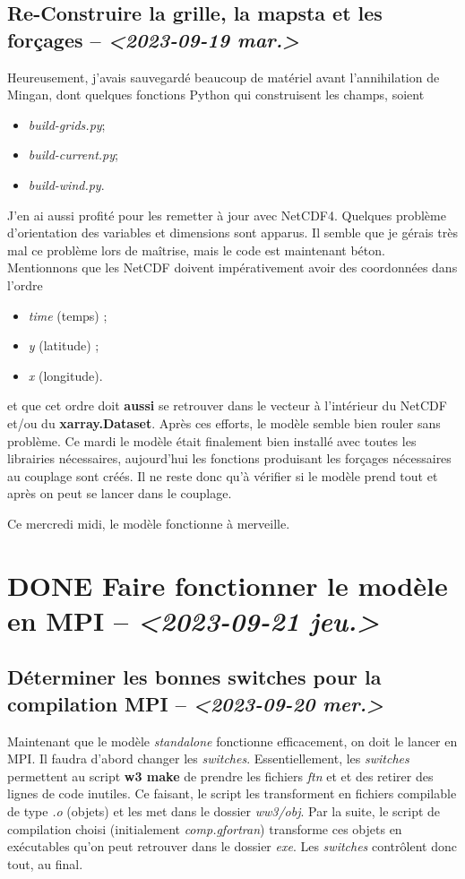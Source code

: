 \documentclass[10pt]{article}
\numberwithin{equation}{section}
\begin{document}
\subsection{Re-Construire la grille, la mapsta et les forçages -- \textit{<2023-09-19 mar.>}}
\label{sec:org55d67d8}
\label{orgb397fb6}
Heureusement, j'avais sauvegardé beaucoup de matériel avant l'annihilation de Mingan, dont quelques fonctions Python qui construisent les champs, soient
\begin{itemize}
\item \emph{build-grids.py};
\item \emph{build-current.py};
\item \emph{build-wind.py}.
\end{itemize}
J'en ai aussi profité pour les remetter à jour avec NetCDF4.
Quelques problème d'orientation des variables et dimensions sont apparus.
Il semble que je gérais très mal ce problème lors de maîtrise, mais le code est maintenant béton.
Mentionnons que les NetCDF doivent impérativement avoir des coordonnées dans l'ordre
\begin{itemize}
\item \emph{time} (temps) ;
\item \emph{y} (latitude) ;
\item \emph{x} (longitude).
\end{itemize}
et que cet ordre doit \textbf{aussi} se retrouver dans le vecteur à l'intérieur du NetCDF et/ou du \textbf{xarray.Dataset}.
Après ces efforts, le modèle semble bien rouler sans problème.
Ce mardi le modèle était finalement bien installé avec toutes les librairies nécessaires, aujourd'hui les fonctions produisant les forçages nécessaires au couplage sont créés.
Il ne reste donc qu'à vérifier si le modèle prend tout et après on peut se lancer dans le couplage.\bigskip

Ce mercredi midi, le modèle fonctionne à merveille.

\section{{\bfseries\sffamily DONE} Faire fonctionner le modèle en MPI -- \textit{<2023-09-21 jeu.>}}
\label{sec:orgfec1d2c}
\subsection{Déterminer les bonnes switches pour la compilation MPI -- \textit{<2023-09-20 mer.>}}
\label{sec:orgc157b99}
Maintenant que le modèle \emph{standalone} fonctionne efficacement, on doit le lancer en MPI.
Il faudra d'abord changer les \emph{switches}.
Essentiellement, les \emph{switches} permettent au script \textbf{w3 make} de prendre les fichiers \emph{ftn} et et des retirer des lignes de code inutiles.
Ce faisant, le script les transforment en fichiers compilable de type \emph{.o} (objets) et les met dans le dossier \emph{ww3/obj}.
Par la suite, le script de compilation choisi (initialement \emph{comp.gfortran}) transforme ces objets en exécutables qu'on peut retrouver dans le dossier \emph{exe}.
Les \emph{switches} contrôlent donc tout, au final. \bigskip
\end{document}
